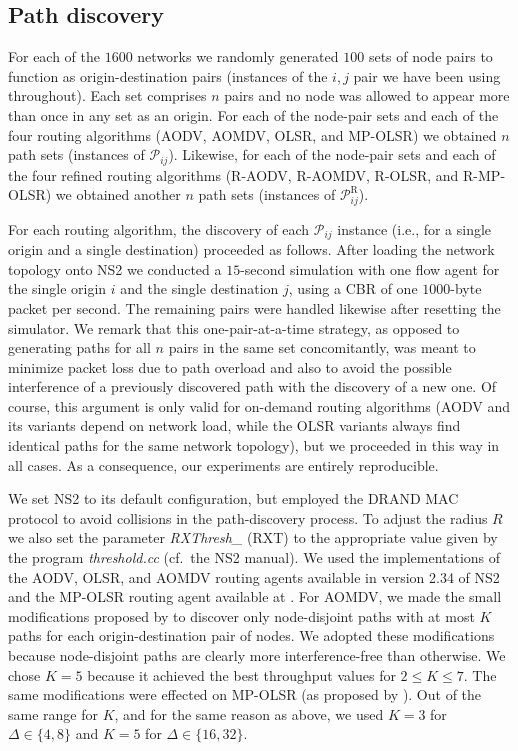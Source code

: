 \documentclass{article}
\begin{document}
\subsection{Path discovery}

For each of the $1600$ networks we randomly generated $100$ sets of node pairs
to function as origin-destination pairs (instances of the $i,j$ pair we have
been using throughout). Each set comprises $n$ pairs and no node was allowed to
appear more than once in any set as an origin. For each of the node-pair sets
and each of the four routing algorithms (AODV, AOMDV, OLSR, and MP-OLSR) we
obtained $n$ path sets (instances of $\mathcal{P}_{ij}$). Likewise, for each of
the node-pair sets and each of the four refined routing algorithms (R-AODV,
R-AOMDV, R-OLSR, and R-MP-OLSR) we obtained another $n$ path sets (instances of
$\mathcal{P}^\mathrm{R}_{ij}$).

For each routing algorithm, the discovery of each $\mathcal{P}_{ij}$ instance
(i.e., for a single origin and a single destination) proceeded as follows. After
loading the network topology onto NS2 we conducted a $15$-second simulation with
one flow agent for the single origin $i$ and the single destination $j$, using a
CBR of one $1000$-byte packet per second. The remaining pairs were handled
likewise after resetting the simulator. We remark that this one-pair-at-a-time
strategy, as opposed to generating paths for all $n$ pairs in the same set
concomitantly, was meant to minimize packet loss due to path overload and also
to avoid the possible interference of a previously discovered path with the
discovery of a new one. Of course, this argument is only valid for on-demand
routing algorithms (AODV and its variants depend on network load, while the OLSR
variants always find identical paths for the same network topology), but we
proceeded in this way in all cases. As a consequence, our experiments are
entirely reproducible.

We set NS2 to its default configuration, but employed the DRAND MAC protocol
\cite{Rhee2006} to avoid collisions in the path-discovery process. To adjust the
radius $R$ we also set the parameter \emph{RXThresh\_} (RXT) to the appropriate
value given by the program \emph{threshold.cc} (cf.\ the NS2 manual). We used
the implementations of the AODV, OLSR, and AOMDV routing agents available in
version 2.34 of NS2 and the MP-OLSR routing agent available at \cite{mpolsr}.
For AOMDV, we made the small modifications proposed by \cite{YuHua2005} to
discover only node-disjoint paths with at most $K$ paths for each
origin-destination pair of nodes. We adopted these modifications because
node-disjoint paths are clearly more interference-free than otherwise. We chose
$K=5$ because it achieved the best throughput values for $2\le K\le 7$. The same
modifications were effected on MP-OLSR (as proposed by \cite{Xun2005}). Out of
the same range for $K$, and for the same reason as above, we used $K=3$ for
$\Delta\in\{4,8\}$ and $K=5$ for $\Delta \in \{16,32\}$.
\end{document}
